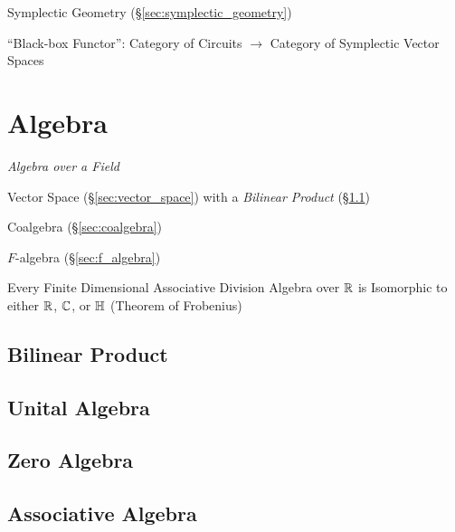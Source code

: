 Symplectic Geometry (\S\ref{sec:symplectic_geometry})

``Black-box Functor'': Category of Circuits $\rightarrow$ Category of
Symplectic Vector Spaces %



\section{Algebra}\label{sec:algebra}

\emph{Algebra over a Field}

Vector Space (\S\ref{sec:vector_space}) with a \emph{Bilinear Product}
(\S\ref{sec:bilinear_product})

Coalgebra (\S\ref{sec:coalgebra})

$F$-algebra (\S\ref{sec:f_algebra})

Every Finite Dimensional Associative Division Algebra over $\mathbb{R}$ is
Isomorphic to either $\mathbb{R}$, $\mathbb{C}$, or $\mathbb{H}$ (Theorem of
Frobenius) %



\subsection{Bilinear Product}\label{sec:bilinear_product}

\subsection{Unital Algebra}\label{sec:unital_algebra}

\subsection{Zero Algebra}\label{sec:zero_algebra}

\subsection{Associative Algebra}\label{sec:associative_algebra}



